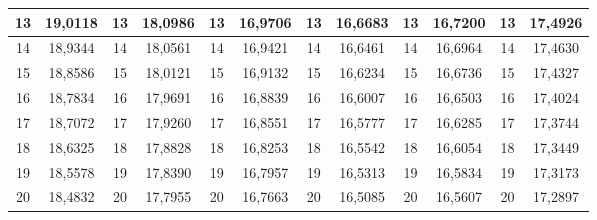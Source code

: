 \documentclass[a4paper,12pt]{article} %
\begin{document}
\begin{longtable}[c]{cccccccccc|c|c|}
	\multicolumn{1}{|c|}{13} & \multicolumn{1}{c|}{19,0118} & \multicolumn{1}{c|}{13} & \multicolumn{1}{c|}{18,0986} & \multicolumn{1}{c|}{13} & \multicolumn{1}{c|}{16,9706} & \multicolumn{1}{c|}{13} & \multicolumn{1}{c|}{16,6683} & \multicolumn{1}{c|}{13} & 16,7200 & 13 & 17,4926 \\ \hline
	\multicolumn{1}{|c|}{14} & \multicolumn{1}{c|}{18,9344} & \multicolumn{1}{c|}{14} & \multicolumn{1}{c|}{18,0561} & \multicolumn{1}{c|}{14} & \multicolumn{1}{c|}{16,9421} & \multicolumn{1}{c|}{14} & \multicolumn{1}{c|}{16,6461} & \multicolumn{1}{c|}{14} & 16,6964 & 14 & 17,4630 \\ \hline
	\multicolumn{1}{|c|}{15} & \multicolumn{1}{c|}{18,8586} & \multicolumn{1}{c|}{15} & \multicolumn{1}{c|}{18,0121} & \multicolumn{1}{c|}{15} & \multicolumn{1}{c|}{16,9132} & \multicolumn{1}{c|}{15} & \multicolumn{1}{c|}{16,6234} & \multicolumn{1}{c|}{15} & 16,6736 & 15 & 17,4327 \\ \hline
	\multicolumn{1}{|c|}{16} & \multicolumn{1}{c|}{18,7834} & \multicolumn{1}{c|}{16} & \multicolumn{1}{c|}{17,9691} & \multicolumn{1}{c|}{16} & \multicolumn{1}{c|}{16,8839} & \multicolumn{1}{c|}{16} & \multicolumn{1}{c|}{16,6007} & \multicolumn{1}{c|}{16} & 16,6503 & 16 & 17,4024 \\ \hline
	\multicolumn{1}{|c|}{17} & \multicolumn{1}{c|}{18,7072} & \multicolumn{1}{c|}{17} & \multicolumn{1}{c|}{17,9260} & \multicolumn{1}{c|}{17} & \multicolumn{1}{c|}{16,8551} & \multicolumn{1}{c|}{17} & \multicolumn{1}{c|}{16,5777} & \multicolumn{1}{c|}{17} & 16,6285 & 17 & 17,3744 \\ \hline
	\multicolumn{1}{|c|}{18} & \multicolumn{1}{c|}{18,6325} & \multicolumn{1}{c|}{18} & \multicolumn{1}{c|}{17,8828} & \multicolumn{1}{c|}{18} & \multicolumn{1}{c|}{16,8253} & \multicolumn{1}{c|}{18} & \multicolumn{1}{c|}{16,5542} & \multicolumn{1}{c|}{18} & 16,6054 & 18 & 17,3449 \\ \hline
	\multicolumn{1}{|c|}{19} & \multicolumn{1}{c|}{18,5578} & \multicolumn{1}{c|}{19} & \multicolumn{1}{c|}{17,8390} & \multicolumn{1}{c|}{19} & \multicolumn{1}{c|}{16,7957} & \multicolumn{1}{c|}{19} & \multicolumn{1}{c|}{16,5313} & \multicolumn{1}{c|}{19} & 16,5834 & 19 & 17,3173 \\ \hline
	\multicolumn{1}{|c|}{20} & \multicolumn{1}{c|}{18,4832} & \multicolumn{1}{c|}{20} & \multicolumn{1}{c|}{17,7955} & \multicolumn{1}{c|}{20} & \multicolumn{1}{c|}{16,7663} & \multicolumn{1}{c|}{20} & \multicolumn{1}{c|}{16,5085} & \multicolumn{1}{c|}{20} & 16,5607 & 20 & 17,2897 \\ \hline

\end{longtable}
\end{document}
